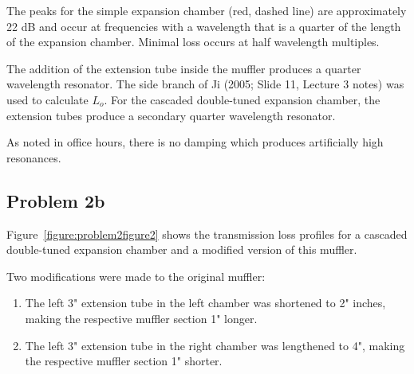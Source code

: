 \vspace{0.25cm}
The peaks for the simple expansion chamber (red, dashed line) are approximately 22 dB and occur at frequencies with a wavelength that is a quarter of the length of the expansion chamber.  Minimal loss occurs at half wavelength multiples.

\vspace{0.25cm}
The addition of the extension tube inside the muffler produces a quarter wavelength resonator.  The side branch of Ji (2005;  Slide 11, Lecture 3 notes) was used to calculate $L_o$.  For the cascaded double-tuned expansion chamber, the extension tubes produce a secondary quarter wavelength resonator.

\vspace{0.25cm}
As noted in office hours, there is no damping which produces artificially high resonances.


%
%
%



\subsection*{Problem 2b}

Figure~\ref{figure:problem2figure2} shows the transmission loss profiles for a cascaded double-tuned expansion chamber and a modified version of this muffler.

\vspace{0.25cm}
Two modifications were made to the original muffler:

\begin{enumerate}[itemsep=0.3cm]
  \item The left 3" extension tube in the left chamber was shortened to 2" inches, making the respective muffler section 1" longer.
  \item The left 3" extension tube in the right chamber was lengthened to 4", making the respective muffler section 1" shorter.
\end{enumerate}

%
%
%

